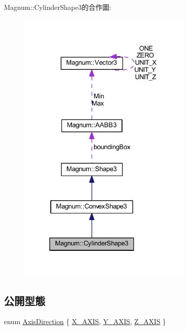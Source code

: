 Magnum\+:\+:Cylinder\+Shape3的合作圖\+:\nopagebreak
\begin{figure}[H]
\begin{center}
\leavevmode
\includegraphics[width=243pt]{class_magnum_1_1_cylinder_shape3__coll__graph}
\end{center}
\end{figure}
\subsection*{公開型態}
\begin{DoxyCompactItemize}
\item 
enum \hyperlink{class_magnum_1_1_cylinder_shape3_a48fd2f573e5d5a4c05914dd5c2def60b}{Axis\+Direction} \{ \hyperlink{class_magnum_1_1_cylinder_shape3_a48fd2f573e5d5a4c05914dd5c2def60ba16ae6d8725f786573e86695b85ee1cad}{X\+\_\+\+A\+X\+IS}, 
\hyperlink{class_magnum_1_1_cylinder_shape3_a48fd2f573e5d5a4c05914dd5c2def60ba26eb1d04cc687989f719a3260ad3462f}{Y\+\_\+\+A\+X\+IS}, 
\hyperlink{class_magnum_1_1_cylinder_shape3_a48fd2f573e5d5a4c05914dd5c2def60baf8643a91a4ac4ffcfc0363269a1ad22f}{Z\+\_\+\+A\+X\+IS}
 \}
\end{DoxyCompactItemize}
